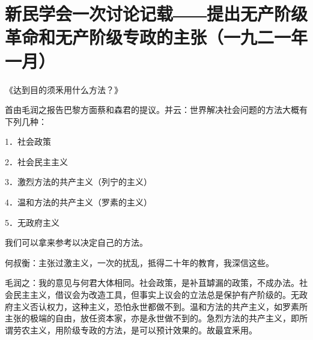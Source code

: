 \section{新民学会一次讨论记载――提出无产阶级革命和无产阶级专政的主张（一九二一年一月）}


《达到目的须釆用什么方法？》

首由毛润之报告巴黎方面蔡和森君的提议。并云：世界解决社会问题的方法大概有下列几种：

1．社会政策

2．社会民主主义

3．激烈方法的共产主义（列宁的主义）

4．温和方法的共产主义（罗素的主义）

5．无政府主义

我们可以拿来参考以决定自己的方法。

何叔衡：主张过激主义，一次的扰乱，抵得二十年的教育，我深信这些。

毛润之：我的意见与何君大体相同。社会政策，是补苴罅漏的政策，不成办法。社会民主主义，借议会为改造工具，但事实上议会的立法总是保护有产阶级的。无政府主义否认权力，这种主义，恐怕永世都做不到。温和方法的共产主义，如罗素所主张的极端的自由，放任资本家，亦是永世做不到的。急烈方法的共产主义，即所谓劳农主义，用阶级专政的方法，是可以预计效果的。故最宜釆用。

